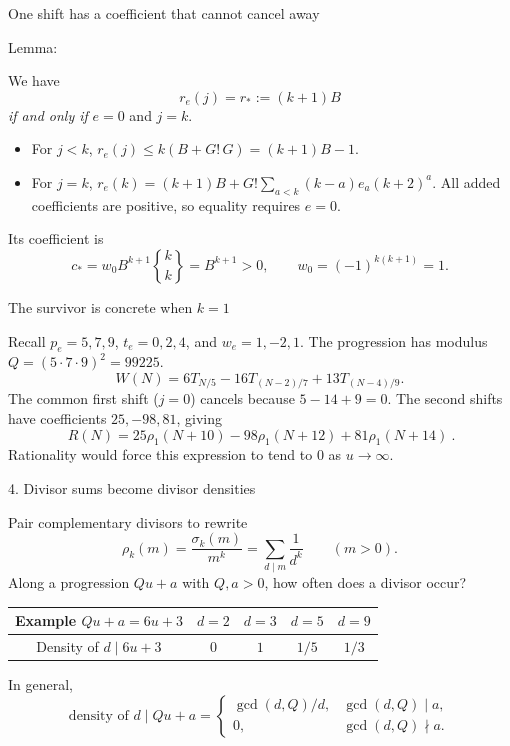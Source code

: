 \documentclass[11pt,aspectratio=169]{beamer}
\newcommand{\stir}[2]{\genfrac{\{}{\}}{0pt}{}{#1}{#2}}
\begin{document}

\begin{frame}{One shift has a coefficient that cannot cancel away}

Lemma:

We have
\[
 r_e(j)=r_*:=(k+1)B
\]
\emph{if and only if} $e=0$ and $j=k$.
\begin{itemize}
\item For $j<k$, $r_e(j)\le k(B+G!\,G)=(k+1)B-1$.
\item For $j=k$, $r_e(k)=(k+1)B+
G!\sum_{a<k}(k-a)e_a(k+2)^a$.
All added coefficients are positive, so equality requires $e=0$.
\end{itemize}
Its coefficient is
\[
 c_*=w_0B^{k+1}\stir{k}{k}=B^{k+1}>0,
 \qquad w_0=(-1)^{k(k+1)}=1.
\]

\end{frame}


\begin{frame}{The survivor is concrete when $k=1$}

Recall $p_e=5,7,9$, $t_e=0,2,4$, and $w_e=1,-2,1$.
The progression has modulus $Q=(5\cdot7\cdot9)^2=99225$.
\[
 W(N)=6T_{N/5}-16T_{(N-2)/7}+13T_{(N-4)/9}.
\]
The common first shift ($j=0$) cancels because $5-14+9=0$.
The second shifts have coefficients $25,-98,81$, giving
\[
 \boxed{\ R(N)=25\rho_1(N+10)-98\rho_1(N+12)+81\rho_1(N+14)\ }.
\]
Rationality would force this expression to tend to $0$ as $u\to\infty$.

\end{frame}


\begin{frame}{4. Divisor sums become divisor densities}

Pair complementary divisors to rewrite
\[
 \rho_k(m)=\frac{\sigma_k(m)}{m^k}=\sum_{d\mid m}\frac1{d^k}
 \qquad(m>0).
\]
Along a progression $Qu+a$ with $Q,a>0$, how often does a divisor occur?
\begin{center}
\renewcommand{\arraystretch}{1.3}
\begin{tabular}{@{}c|cccc@{}}
Example $Qu+a=6u+3$ & $d=2$ & $d=3$ & $d=5$ & $d=9$\\
\hline
Density of $d\mid6u+3$ & $0$ & $1$ & $1/5$ & $1/3$
\end{tabular}
\end{center}
In general,
\[
 \text{density of }d\mid Qu+a=
 \begin{cases}\gcd(d,Q)/d,&\gcd(d,Q)\mid a,\\0,&\gcd(d,Q)\nmid a.\end{cases}
\]

\end{frame}
\end{document}
